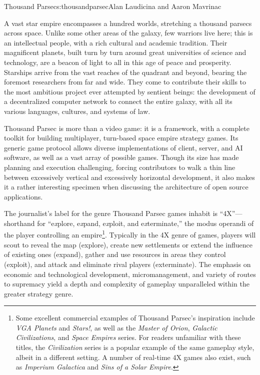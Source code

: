 \begin{aosachapter}{Thousand Parsec}{s:thousandparsec}{Alan Laudicina and Aaron Mavrinac}

A vast star empire encompasses a hundred worlds, stretching a thousand
parsecs across space. Unlike some other areas of the galaxy, few
warriors live here; this is an intellectual people, with a rich
cultural and academic tradition. Their magnificent planets, built turn
by turn around great universities of science and technology, are a
beacon of light to all in this age of peace and prosperity. Starships
arrive from the vast reaches of the quadrant and beyond, bearing the
foremost researchers from far and wide. They come to contribute their
skills to the most ambitious project ever attempted by sentient
beings: the development of a decentralized computer network to connect
the entire galaxy, with all its various languages, cultures, and
systems of law.

Thousand Parsec is more than a video game: it is a framework, with a
complete toolkit for building multiplayer, turn-based space empire
strategy games. Its generic game protocol allows diverse
implementations of client, server, and AI software, as well as a vast
array of possible games. Though its size
has made planning and execution challenging,
forcing contributors to walk a thin line between
excessively vertical and excessively horizontal development, it also
makes it a rather interesting specimen when discussing the
architecture of open source applications.

The journalist's label for the genre Thousand Parsec games inhabit is
``4X''---shorthand for ``e\emph{x}plore, e\emph{x}pand,
e\emph{x}ploit, and e\emph{x}terminate,'' the modus operandi of the
player controlling an empire\footnote{Some excellent commercial
examples of Thousand Parsec's inspiration include \emph{VGA Planets}
and \emph{Stars!}, as well as the \emph{Master of Orion},
\emph{Galactic Civilizations}, and \emph{Space Empires} series. For
readers unfamiliar with these titles, the \emph{Civilization} series
is a popular example of the same gameplay style, albeit in a
different setting. A number of real-time 4X games also exist, such
as \emph{Imperium Galactica} and \emph{Sins of a Solar Empire}.}.
Typically in the 4X genre of games, players will scout to reveal the
map (explore), create new settlements or extend the influence of
existing ones (expand), gather and use resources in areas they control
(exploit), and attack and eliminate rival players (exterminate). The
emphasis on economic and technological development, micromanagement,
and variety of routes to supremacy yield a depth and complexity of
gameplay unparalleled within the greater strategy genre.


\end{aosachapter}
